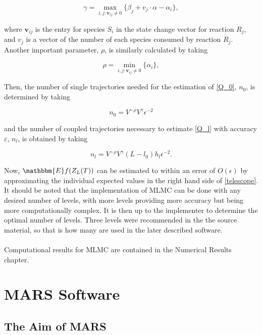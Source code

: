 \documentclass[ugrad,lot,lof,openright,11pt,oneside,onehalfspace]{RUthesis}
\begin{document}
		\begin{equation}\label{gamma}
		\gamma = \max_{i,j \colon \mathbf{v}_{ij} \neq 0} \{ \beta_j + v_j \cdot \alpha - \alpha_i \},
		\end{equation}

		\noindent
		where $\mathbf{v}_{ij}$ is the entry for species $S_i$ in the state change vector for reaction $R_j$, and $v_j$ is a vector of the number of each species consumed by reaction $R_j$. Another important parameter, $\rho$, is similarly calculated by taking

		\begin{equation}\label{rho}
		\rho = \min_{i,j \colon \mathbf{v}_{ij} \neq 0} \{ \alpha_i \},
		\end{equation}

		\noindent
		Then, the number of single trajectories needed for the estimation of \eqref{Q_0}, $n_0$, is determined by taking

		\begin{equation}
		n_0 = V^{-\rho}V^{\gamma}\epsilon^{-2}
		\end{equation}

		\noindent
		and the number of coupled trajectories necessary to estimate \eqref{Q_l} with accuracy $\varepsilon$, $n_l$, is obtained by taking

		\begin{equation}
		n_l = V^{-\rho}V^{\gamma}(L-l_0)h_l\epsilon^{-2}.
		\end{equation}

		\noindent
		Now, $\mathbbm{E}f(Z_L(T))$ can be estimated to within an error of $O(\epsilon)$ by approximating the individual expected values in the right hand side of \eqref{telescope}. It should be noted that the implementation of MLMC can be done with any desired number of levels, with more levels providing more accuracy but being more computationally complex. It is then up to the implementer to determine the optimal number of levels. Three levels were recommended in the the source material, so that is how many are used in the later described software.\\
		\\
		Computational results for MLMC are contained in the Numerical Results chapter. 

\chapter{MARS Software}

	\section{The Aim of MARS}
\end{document}
